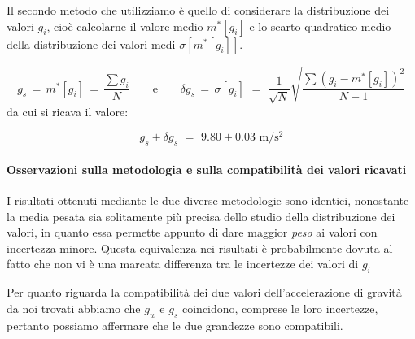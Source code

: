Il secondo metodo che utilizziamo è quello di considerare la distribuzione dei valori $g_i$, cioè calcolarne il valore medio $m^*[g_i]$ e lo scarto quadratico medio della distribuzione dei valori medi $\sigma[m^*[g_i]]$.

\begin{equation*}
g_s \, = \, m^*[g_i] \, = \, \frac{\sum g_i}{N} \quad\quad \text{e} \quad\quad \delta g_s \, = \, \sigma[g_i] \,\, = \,\, \frac{1}{\sqrt{N}}\sqrt{\frac{\sum (g_i - m^*[g_i])^2}{N-1}}
\end{equation*}
%
da cui si ricava il valore:

\begin{equation}
g_s \pm \delta g_s \,\, = \,\, 9.80 \pm 0.03 \,\, \si{\metre\per\square\second}
\end{equation}

\paragraph{Osservazioni sulla metodologia e sulla compatibilità dei valori ricavati\\}

I risultati ottenuti mediante le due diverse metodologie sono identici, nonostante la media pesata sia solitamente più precisa dello studio della distribuzione dei valori, in quanto essa permette appunto di dare maggior \emph{peso} ai valori con incertezza minore. Questa equivalenza nei risultati è probabilmente dovuta al fatto che non vi è una marcata differenza tra le incertezze dei valori di $g_i$

Per quanto riguarda la compatibilità dei due valori dell'accelerazione di gravità da noi trovati abbiamo che $g_w$ e $g_s$ coincidono, comprese le loro incertezze, pertanto possiamo affermare che le due grandezze sono compatibili.


